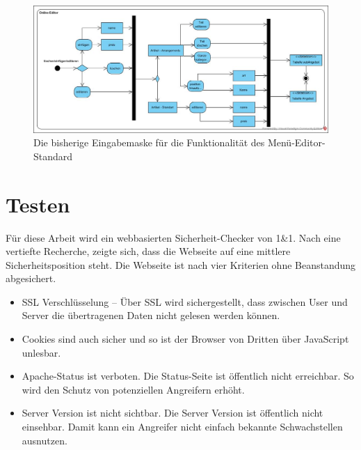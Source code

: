 \begin{figure}[h]
	\centering
	\includegraphics[width=1\linewidth]{Graphics/OnlineEdior.jpg}
	\caption[Kundeansicht]{Die bisherige Eingabemaske für die Funktionalität des Menü-Editor-Standard}
	\label{fig: Editor-Menü-Funktionalität}
\end{figure}



\section{Testen} 


Für diese Arbeit wird ein webbasierten Sicherheit-Checker von 1\&1. Nach eine vertiefte Recherche, zeigte sich, dass die Webseite auf eine mittlere Sicherheitsposition steht. Die Webseite ist nach vier Kriterien ohne Beanstandung abgesichert.

\begin{itemize}	
	
\item\ac{SSL} Verschlüsselung – Über SSL wird sichergestellt, dass zwischen User und Server die übertragenen Daten nicht gelesen werden können.

\item Cookies sind auch sicher und so ist der Browser von Dritten über JavaScript unlesbar.

\item Apache-Status ist verboten. Die Status-Seite ist öffentlich nicht erreichbar. So wird den Schutz von potenziellen Angreifern erhöht. 

\item Server Version ist nicht sichtbar. Die Server Version ist öffentlich nicht einsehbar. Damit kann ein Angreifer nicht einfach bekannte Schwachstellen ausnutzen.
\end{itemize}

